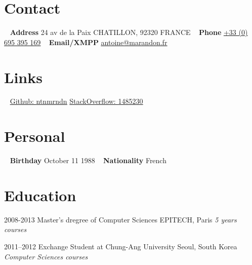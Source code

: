\documentclass[]{template/friggeri-cv} %
\begin{document}


\begin{aside} %
\section{Contact}
~
\textbf{Address}
24 av de la Paix
CHATILLON, 92320
FRANCE
~
\textbf{Phone}
\href{tel:0033695395169}{\underline{+33 (0) 695 395 169}}
~
\textbf{Email/XMPP}
\href{mailto:antoine@marandon.fr}{\underline{antoine@marandon.fr}}
\section {Links}
~
\href{https://github.com/ntnmrndn}{Github: \underline{ntnmrndn}}
\href{http://stackoverflow.com/users/1485230/}{StackOverflow: \underline{1485230}}
\section{Personal}
~
\textbf{Birthday}
October 11 1988
~
\textbf{Nationality}
French
\end{aside}


\section{Education}

\begin{entrylist}


\entry
{2008-2013}
{Master's dregree {\normalfont of Computer Sciences}}
{EPITECH, Paris}
{\emph{5 years courses}}


\entry
{2011--2012}
{Exchange Student {\normalfont at Chung-Ang University}}
{Seoul, South Korea}
{\emph{Computer Sciences courses}}


\end{entrylist}
\end{document}
